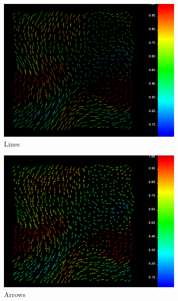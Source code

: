 		\begin{figure}[htb]
		    \centering
		    \begin{subfigure}[htb]{.49\textwidth}
		        \includegraphics[width =\textwidth]{content/pictures/lines.png}
		        \caption{Lines}
		        \label{fig:lines}
		    \end{subfigure}
		    \begin{subfigure}[htb]{.49\textwidth}
		        \includegraphics[width =\textwidth]{content/pictures/arrows.png}
		        \caption{Arrows}
		        \label{fig:arrows}
		    \end{subfigure}
		    \begin{subfigure}[htb]{.49\textwidth}

\end{subfigure}
\end{figure}

